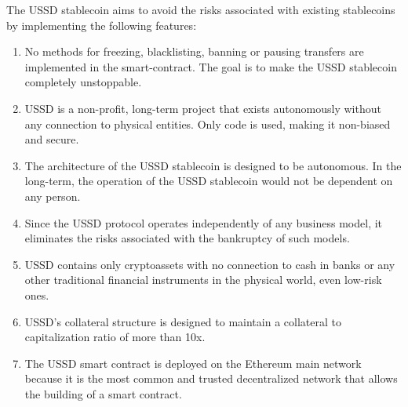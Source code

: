 The USSD stablecoin aims to avoid the risks associated with existing stablecoins 
by implementing the following features:
\begin{enumerate}
  \item No methods for freezing, blacklisting, banning or pausing transfers are 
  implemented in the smart-contract. The goal is to make the USSD stablecoin completely unstoppable.
  \item USSD is a non-profit, long-term project that exists autonomously without any 
  connection to physical entities. Only code is used, making it non-biased and secure.
  \item The architecture of the USSD stablecoin is designed to be autonomous. In the 
  long-term, the operation of the USSD stablecoin would not be dependent on any person.
  \item Since the USSD protocol operates independently of any business model, it 
  eliminates the risks associated with the bankruptcy of such models.
  \item USSD contains only cryptoassets with no connection to cash in banks or any 
  other traditional financial instruments in the physical world, even low-risk ones.
  \item USSD's collateral structure is designed to maintain a collateral to capitalization 
  ratio of more than 10x.
  \item The USSD smart contract is deployed on the Ethereum main network because it is 
  the most common and trusted decentralized network that allows the building of a smart contract.
\end{enumerate}

